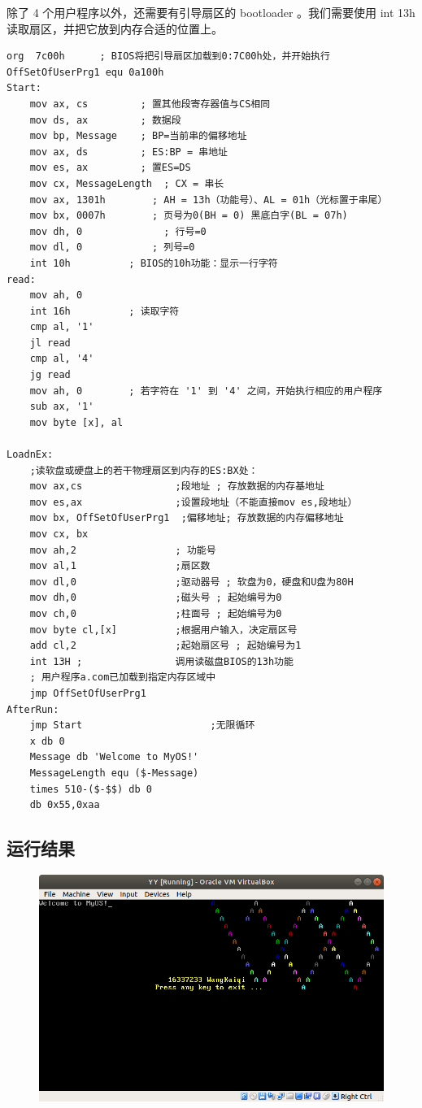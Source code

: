 \documentclass{article}
\begin{document}
除了 4 个用户程序以外，还需要有引导扇区的 bootloader 。我们需要使用 int 13h 读取扇区，并把它放到内存合适的位置上。

\begin{lstlisting}[language={[x86masm]Assembler}]
org  7c00h		; BIOS将把引导扇区加载到0:7C00h处，并开始执行
OffSetOfUserPrg1 equ 0a100h
Start:
	mov	ax, cs	       ; 置其他段寄存器值与CS相同
	mov	ds, ax	       ; 数据段
	mov	bp, Message	   ; BP=当前串的偏移地址
	mov	ax, ds		   ; ES:BP = 串地址
	mov	es, ax		   ; 置ES=DS
	mov	cx, MessageLength  ; CX = 串长
	mov	ax, 1301h		 ; AH = 13h（功能号）、AL = 01h（光标置于串尾）
	mov	bx, 0007h		 ; 页号为0(BH = 0) 黑底白字(BL = 07h)
    mov dh, 0		       ; 行号=0
	mov	dl, 0			 ; 列号=0
	int	10h			 ; BIOS的10h功能：显示一行字符
read:
	mov ah, 0
	int 16h          ; 读取字符
	cmp al, '1'
	jl read
	cmp al, '4'
	jg read
	mov ah, 0        ; 若字符在 '1' 到 '4' 之间，开始执行相应的用户程序
	sub ax, '1'
	mov byte [x], al
	
LoadnEx:
	;读软盘或硬盘上的若干物理扇区到内存的ES:BX处：
	mov ax,cs                ;段地址 ; 存放数据的内存基地址
	mov es,ax                ;设置段地址（不能直接mov es,段地址）
	mov bx, OffSetOfUserPrg1  ;偏移地址; 存放数据的内存偏移地址
	mov cx, bx
	mov ah,2                 ; 功能号
	mov al,1                 ;扇区数
	mov dl,0                 ;驱动器号 ; 软盘为0，硬盘和U盘为80H
	mov dh,0                 ;磁头号 ; 起始编号为0
	mov ch,0                 ;柱面号 ; 起始编号为0
	mov byte cl,[x]          ;根据用户输入，决定扇区号
	add cl,2                 ;起始扇区号 ; 起始编号为1
	int 13H ;                调用读磁盘BIOS的13h功能
	; 用户程序a.com已加载到指定内存区域中
	jmp OffSetOfUserPrg1
AfterRun:
	jmp Start                      ;无限循环
	x db 0
	Message db 'Welcome to MyOS!'
	MessageLength equ ($-Message)
	times 510-($-$$) db 0
	db 0x55,0xaa
\end{lstlisting}


\newpage

\subsection{运行结果}

\begin{figure}[!hbp]
	\centering
	\includegraphics[scale=0.6]{pics/1.png}
\end{figure}
\end{document}
